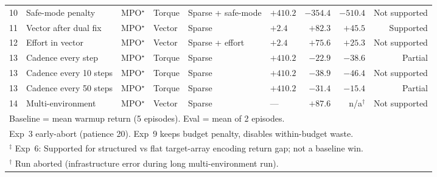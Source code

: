 \begin{table}[htbp]
\begin{tabular}{rlllllrrr}
    10 & Safe-mode penalty & MPO$^\star$ & Torque & Sparse + safe-mode & $+410.2$ & $-354.4$ & $-510.4$ & Not supported \\
    11 & Vector after dual fix & MPO$^\star$ & Vector & Sparse & $+2.4$ & $+82.3$ & $+45.5$ & Supported \\
    12 & Effort in vector & MPO$^\star$ & Vector & Sparse + effort & $+2.4$ & $+75.6$ & $+25.3$ & Not supported \\
    13 & Cadence every step & MPO$^\star$ & Torque & Sparse & $+410.2$ & $-22.9$ & $-38.6$ & Partial \\
    13 & Cadence every 10 steps & MPO$^\star$ & Torque & Sparse & $+410.2$ & $-38.9$ & $-46.4$ & Not supported \\
    13 & Cadence every 50 steps & MPO$^\star$ & Torque & Sparse & $+410.2$ & $-31.4$ & $-15.4$ & Partial \\
    14 & Multi-environment & MPO$^\star$ & Vector & Sparse & --- & $+87.6$ & n/a$^\dagger$ & Not supported \\
    \bottomrule
    \multicolumn{9}{l}{\footnotesize Baseline = mean warmup return (5 episodes). Eval = mean of 2 episodes.} \\
    \multicolumn{9}{l}{\footnotesize Exp~3 early-abort (patience 20). Exp~9 keeps budget penalty, disables within-budget waste.} \\
    \multicolumn{9}{l}{\footnotesize $^\ddagger$ Exp~6: Supported for structured vs flat target-array encoding return gap; not a baseline win.} \\
    \multicolumn{9}{l}{\footnotesize $^\dagger$ Run aborted (infrastructure error during long multi-environment run).} \\
  \end{tabular}
\end{table}
